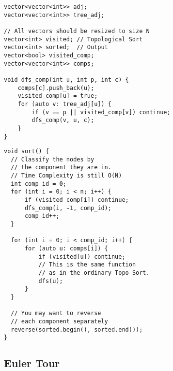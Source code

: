 \begin{center}
\begin{minipage}[t]{0.45\linewidth}
\begin{lstlisting}
vector<vector<int>> adj;
vector<vector<int>> tree_adj;

// All vectors should be resized to size N
vector<int> visited; // Topological Sort
vector<int> sorted;  // Output
vector<bool> visited_comp;
vector<vector<int>> comps;

void dfs_comp(int u, int p, int c) {
    comps[c].push_back(u);
    visited_comp[u] = true;
    for (auto v: tree_adj[u]) {
        if (v == p || visited_comp[v]) continue;
        dfs_comp(v, u, c);
    }
}
\end{lstlisting}
\end{minipage}
\qquad
\begin{minipage}[t]{0.45\linewidth}
\begin{lstlisting}
void sort() {
  // Classify the nodes by
  // the component they are in.
  // Time Complexity is still O(N)
  int comp_id = 0;
  for (int i = 0; i < n; i++) {
      if (visited_comp[i]) continue;
      dfs_comp(i, -1, comp_id);
      comp_id++;
  }

  for (int i = 0; i < comp_id; i++) {
      for (auto u: comps[i]) {
          if (visited[u]) continue;
          // This is the same function
          // as in the ordinary Topo-Sort.
          dfs(u);
      }
  }

  // You may want to reverse
  // each component separately
  reverse(sorted.begin(), sorted.end());
}
\end{lstlisting}
\end{minipage}
\end{center}

\newpage

\subsection{Euler Tour}

